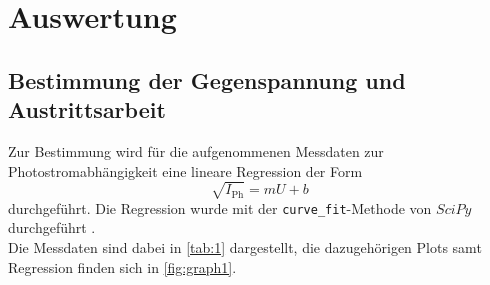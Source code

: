 \section{Auswertung}
\label{sec:auswertung}

\subsection{Bestimmung der Gegenspannung und Austrittsarbeit}

Zur Bestimmung wird für die aufgenommenen Messdaten zur Photostromabhängigkeit eine lineare Regression der Form
\begin{equation*}
    \sqrt{I_\text{Ph}} = m U + b
\end{equation*}
durchgeführt. Die Regression wurde mit der \texttt{curve\_fit}-Methode von $ SciPy $ durchgeführt \cite{sp01}.\\

Die Messdaten sind dabei in \autoref{tab:1} dargestellt, die dazugehörigen Plots samt Regression finden sich in \autoref{fig:graph1}.


